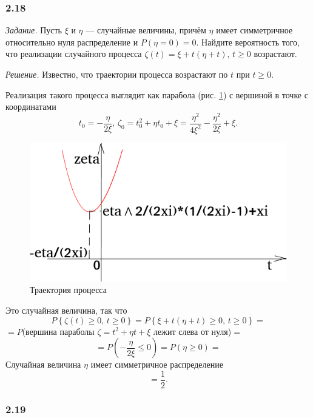 \subsubsection*{2.18}

\textit{Задание.}
Пусть $ \xi $ и $ \eta $ --- случайные величины,
причём $ \eta $ имеет симметричное относительно нуля распределение и
$P \left( \eta = 0 \right) =
  0$.
Найдите вероятность того, что реализации случайного процесса
$ \zeta \left( t \right) = \xi + t \left( \eta + t \right), \, t \geq 0$ возрастают.

\textit{Решение.}
Известно, что траектории процесса возрастают по $t$ при $t \geq 0$.

Реализация такого процесса выглядит как парабола (рис. \ref{fig:218}) с вершиной в точке с координатами
$$t_0 = -\frac{ \eta }{2 \xi }, \,
  \zeta_0 = t_0^2 + \eta t_0 + \xi = \frac{ \eta^2}{4 \xi^2} - \frac{ \eta^2}{2 \xi }  + \xi.$$

\begin{figure}[h!]
 \centering
 \includegraphics[width=.5\textwidth]{./pictures/2_18.png}
 \caption{Траектория процесса}
 \label{fig:218}
\end{figure}

Это случайная величина, так что
$$P \left\{ \zeta \left( t \right) \geq 0, \, t \geq 0 \right\} =
  P \left\{ \xi + t \left( \eta + t \right) \geq 0, \, t \geq 0 \right\} =$$
$=P$(вершина параболы $ \zeta = t^2 + \eta t + \xi $ лежит слева от нуля)$=$
$$= P \left( -\frac{ \eta }{2 \xi } \leq 0 \right) =
  P \left( \eta \geq 0 \right) =$$
Случайная величина $ \eta $ имеет симметричное распределение
$$= \frac{1}{2}.$$

\subsubsection*{2.19}

